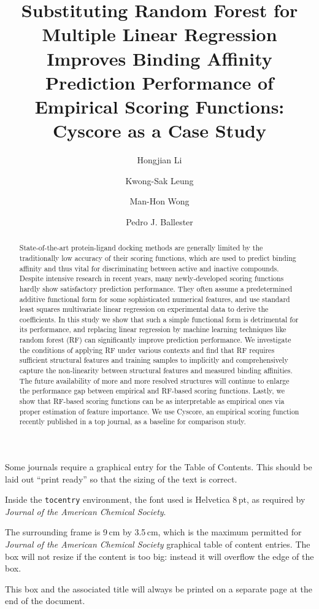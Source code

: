 \documentclass[journal=jacsat,manuscript=article]{achemso}
\author{Hongjian Li}
\author{Kwong-Sak Leung}
\author{Man-Hon Wong}
\affiliation[Chinese University of Hong Kong]
{Department of Computer Science and Engineering, Chinese University of Hong Kong, Shatin, New Territories, Hong Kong}
\author{Pedro J. Ballester}
\affiliation[European Bioinformatics Institute]
{European Bioinformatics Institute, Wellcome Trust Genome Campus, Hinxton, Cambridge - CB10 1SD, UK}
\title[RF::Cyscore]{Substituting Random Forest for Multiple Linear Regression Improves Binding Affinity Prediction Performance of Empirical Scoring Functions: Cyscore as a Case Study}
\begin{document}
\begin{tocentry}

Some journals require a graphical entry for the Table of Contents.
This should be laid out ``print ready'' so that the sizing of the
text is correct.

Inside the \texttt{tocentry} environment, the font used is Helvetica
8\,pt, as required by \emph{Journal of the American Chemical
Society}.

The surrounding frame is 9\,cm by 3.5\,cm, which is the maximum
permitted for  \emph{Journal of the American Chemical Society}
graphical table of content entries. The box will not resize if the
content is too big: instead it will overflow the edge of the box.

This box and the associated title will always be printed on a
separate page at the end of the document.

\end{tocentry}

\begin{abstract}

State-of-the-art protein-ligand docking methods are generally limited by the traditionally low accuracy of their scoring functions, which are used to predict binding affinity and thus vital for discriminating between active and inactive compounds. Despite intensive research in recent years, many newly-developed scoring functions hardly show satisfactory prediction performance. They often assume a predetermined additive functional form for some sophisticated numerical features, and use standard least squares multivariate linear regression on experimental data to derive the coefficients. In this study we show that such a simple functional form is detrimental for its performance, and replacing linear regression by machine learning techniques like random forest (RF) can significantly improve prediction performance. We investigate the conditions of applying RF under various contexts and find that RF requires sufficient structural features and training samples to implicitly and comprehensively capture the non-linearity between structural features and measured binding affinities. The future availability of more and more resolved structures will continue to enlarge the performance gap between empirical and RF-based scoring functions. Lastly, we show that RF-based scoring functions can be as interpretable as empirical ones via proper estimation of feature importance. We use Cyscore, an empirical scoring function recently published in a top journal, as a baseline for comparison study.

\end{abstract}
\end{document}
